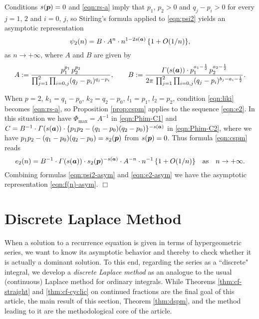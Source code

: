 \documentclass[a4paper,12pt]{article}
\theoremstyle{plain}
\def\vG{\varGamma}
\def\ba{\mbox{\boldmath $a$}}
\def\sba{\mbox{\boldmath ${\scriptstyle a}$}}
\def\bp{\mbox{\boldmath $p$}}
\def\Phim{\Phi_{\scriptstyle \mathrm{max}}}
\begin{document}
\par
Conditions $s(\bp) = 0$ and \eqref{eqn:rs-a} imply that $p_1$, $p_2 > 0$ and 
$q_j - p_i > 0$ for every $j = 1$, $2$ and $i = 0$, $j$, so Stirling's formula 
applied to \eqref{eqn:psi2} yields an asymptotic representation  
\begin{equation}  \label{eqn:psi2-asym}
\psi_2(n) = B \cdot A^n \cdot n^{1-2 s(\sba)} \, \{ 1 + O(1/n) \},  
\end{equation}
as $n \to + \infty$, where $A$ and $B$ are given by 
\[ 
A := \frac{p_1^{p_1} \, p_2^{p_2}}{ \prod_{j=1}^2 \prod_{i=0,j} (q_j-p_i)^{q_j-p_i} }, 
\qquad 
B := \frac{\vG(s(\ba)) \cdot p_1^{a_1- \frac{1}{2} } \, 
p_2^{a_2- \frac{1}{2} }}{ 2 \pi \, \prod_{j=1}^2 \prod_{i=0, j}    
(q_j-p_i)^{b_j-a_i- \frac{1}{2} } }. 
\]
\par
When $p = 2$, $k_1 = q_1-p_0$, $k_2 = q_2-p_0$, $l_1 = p_1$, $l_2 = p_2$, 
condition \eqref{eqn:liki} becomes \eqref{eqn:rs-a}, so 
Proposition \ref{prop:cspm} applies to the sequence \eqref{eqn:e2}. 
In this situation we have $\Phim = A^{-1}$ in \eqref{eqn:Phim-C1} 
and $C = B^{-1} \cdot \vG(s(\ba)) \cdot 
\{p_1p_2-(q_1-p_0)(q_2-p_0)\}^{-s(\sba)}$ in \eqref{eqn:Phim-C2}, 
where we have $p_1 p_2 -(q_1-p_0)(q_2-p_0) = s_2(\bp)$ 
from $s(\bp) = 0$.   
Thus formula \eqref{eqn:cspm} reads  
\begin{equation} \label{eqn:e2-asym}
e_2(n) = B^{-1} \cdot \vG(s(\ba)) \cdot s_2(\bp)^{-s(\sba)} 
\cdot A^{-n} \cdot n^{-1} \, \{1 + O(1/n) \} \quad \mbox{as} \quad 
n \to + \infty.    
\end{equation}
Combining formulas \eqref{eqn:psi2-asym} and \eqref{eqn:e2-asym} we have 
the asymptotic representation \eqref{eqn:f(n)-asym}.  \hfill $\Box$   
\section{Discrete Laplace Method} \label{sec:dspm}
When a solution to a recurrence equation is given in terms of 
hypergeometric series, we want to know its asymptotic behavior and 
thereby to check whether it is actually a dominant solution.  
To this end, regarding the series as a ``discrete" integral, 
we develop a {\sl discrete Laplace method} as an analogue to 
the usual (continuous) Laplace method for ordinary integrals.  
While Theorems \ref{thm:cf-straight} and \ref{thm:cf-cyclic} on continued 
fractions are the final goal of this article, the main result of this section, 
Theorem \ref{thm:dspm}, and the method leading to it are the 
methodological core of the article.       
\end{document}
